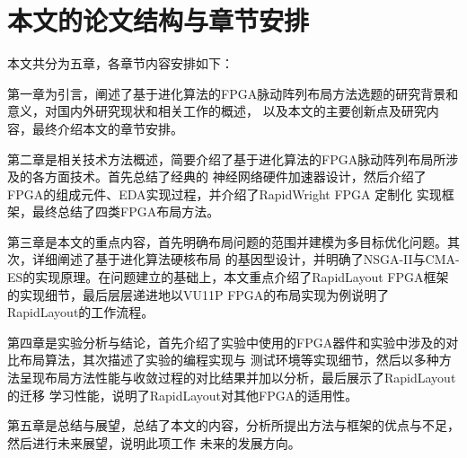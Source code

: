 \section{本文的论文结构与章节安排}
\label{sec:arrangement}
本文共分为五章，各章节内容安排如下：

第一章为引言，阐述了基于进化算法的FPGA脉动阵列布局方法选题的研究背景和意义，对国内外研究现状和相关工作的概述，
以及本文的主要创新点及研究内容，最终介绍本文的章节安排。


第二章是相关技术方法概述，简要介绍了基于进化算法的FPGA脉动阵列布局所涉及的各方面技术。首先总结了经典的
神经网络硬件加速器设计，然后介绍了FPGA的组成元件、EDA实现过程，并介绍了RapidWright FPGA 定制化
实现框架，最终总结了四类FPGA布局方法。

第三章是本文的重点内容，首先明确布局问题的范围并建模为多目标优化问题。其次，详细阐述了基于进化算法硬核布局
的基因型设计，并明确了NSGA-II与CMA-ES的实现原理。在问题建立的基础上，本文重点介绍了RapidLayout FPGA框架
的实现细节，最后层层递进地以VU11P FPGA的布局实现为例说明了RapidLayout的工作流程。

第四章是实验分析与结论，首先介绍了实验中使用的FPGA器件和实验中涉及的对比布局算法，其次描述了实验的编程实现与
测试环境等实现细节，然后以多种方法呈现布局方法性能与收敛过程的对比结果并加以分析，最后展示了RapidLayout的迁移
学习性能，说明了RapidLayout对其他FPGA的适用性。

第五章是总结与展望，总结了本文的内容，分析所提出方法与框架的优点与不足，然后进行未来展望，说明此项工作
未来的发展方向。

